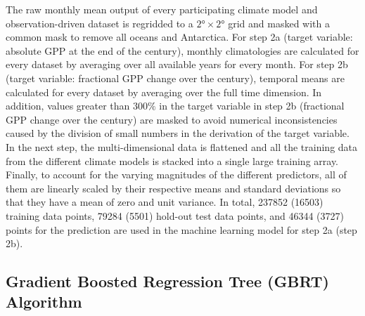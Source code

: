The raw monthly mean output of every participating climate model and
observation-driven dataset is regridded to a $\ang{2} \times \ang{2}$ grid and
masked with a common mask to remove all oceans and Antarctica. For step 2a
(target variable: absolute \acf{GPP} at the end of the  century),
monthly climatologies are calculated for every dataset by averaging over all
available years for every month. For step 2b (target variable: fractional
\ac{GPP} change over the  century), temporal means are calculated for
every dataset by averaging over the full time dimension. In addition, values
greater than $300 \unit{\%}$ in the target variable in step 2b (fractional
\ac{GPP} change over the  century) are masked to avoid numerical
inconsistencies caused by the division of small numbers in the derivation of
the target variable. In the next step, the multi-dimensional data is flattened
and all the training data from the different climate models is stacked into a
single large training array. Finally, to account for the varying magnitudes of
the different predictors, all of them are linearly scaled by their respective
means and standard deviations so that they have a mean of zero and unit
variance. In total, 237852 (16503) training data points, 79284 (5501) hold-out
test data points, and 46344 (3727) points for the prediction are used in the
machine learning model for step 2a (step 2b).


\subsection{Gradient Boosted Regression Tree (\acs{GBRT}) Algorithm}
\label{subsec:app:b:gbrt}

